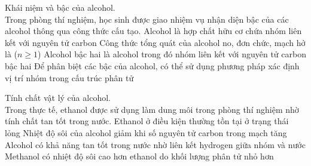 \documentclass[12pt,a4paper]{article}
\begin{document}
\begin{ex}
Khái niệm và bậc của alcohol.\\
Trong phòng thí nghiệm, học sinh được giao nhiệm vụ nhận diện bậc của các alcohol thông qua công thức cấu tạo.
\choiceTF
{Alcohol là hợp chất hữu cơ chứa nhóm  liên kết với nguyên tử carbon}
{\True Công thức tổng quát của alcohol no, đơn chức, mạch hở là  ($n \ge 1$)}
{\True Alcohol bậc hai là alcohol trong đó nhóm  liên kết với nguyên tử carbon bậc hai}
{\True Để phân biệt các bậc của alcohol, có thể sử dụng phương pháp xác định vị trí nhóm  trong cấu trúc phân tử}
\end{ex}

\begin{ex}
Tính chất vật lý của alcohol.\\
Trong thực tế, ethanol được sử dụng làm dung môi trong phòng thí nghiệm nhờ tính chất tan tốt trong nước.
\choiceTF
{\True Ethanol ở điều kiện thường tồn tại ở trạng thái lỏng}
{Nhiệt độ sôi của alcohol giảm khi số nguyên tử carbon trong mạch tăng}
{\True Alcohol có khả năng tan tốt trong nước nhờ liên kết hydrogen giữa nhóm  và nước}
{Methanol có nhiệt độ sôi cao hơn ethanol do khối lượng phân tử nhỏ hơn}
\end{ex}
\end{document}
